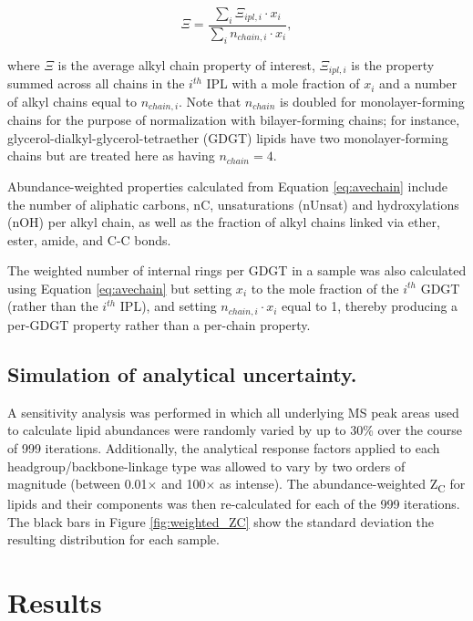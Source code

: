 \begin{equation} \label{eq:avechain}
\Xi = \frac{\sum_{i} \Xi_{ipl,i} \cdot x_{i}}{\sum_{i} n_{chain,i} \cdot x_{i}},
\end{equation}

\noindent where $\Xi$ is the average alkyl chain property of interest, $\Xi_{ipl,i}$ is the property summed across all chains in the $i^{th}$ IPL with a mole fraction of $x_{i}$ and a number of alkyl chains equal to $n_{chain,i}$. Note that $n_{chain}$ is doubled for monolayer-forming chains for the purpose of normalization with bilayer-forming chains; for instance, glycerol-dialkyl-glycerol-tetraether (GDGT) lipids have two monolayer-forming chains but are treated here as having $n_{chain} = 4$.

Abundance-weighted properties calculated from Equation \ref{eq:avechain} include the number of aliphatic carbons, nC, unsaturations (nUnsat) and hydroxylations (nOH) per alkyl chain, as well as the fraction of alkyl chains linked via ether, ester, amide, and C-C bonds.

The weighted number of internal rings per GDGT in a sample was also calculated using Equation \ref{eq:avechain} but setting $x_{i}$ to the mole fraction of the $i^{th}$ GDGT (rather than the $i^{th}$ IPL), and setting $n_{chain,i} \cdot x_{i}$ equal to 1, thereby producing a per-GDGT property rather than a per-chain property.

\subsection{Simulation of analytical uncertainty.} A sensitivity analysis was performed in which all underlying MS peak areas used to calculate lipid abundances were randomly varied by up to 30\% over the course of 999 iterations. Additionally, the analytical response factors applied to each headgroup/backbone-linkage type was allowed to vary by two orders of magnitude (between 0.01$\times$ and 100$\times$ as intense). The abundance-weighted Z\textsubscript{C} for lipids and their components was then re-calculated for each of the 999 iterations. The black bars in Figure \ref{fig:weighted_ZC} show the standard deviation the resulting distribution for each sample.

\section{Results}
